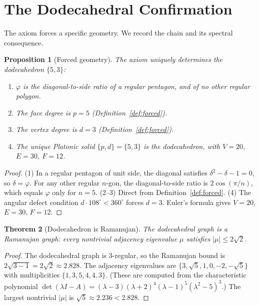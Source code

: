\documentclass[12pt, a4paper]{article}
\theoremstyle{plain}
\newtheorem{theorem}{Theorem}[section]
\newtheorem{proposition}[theorem]{Proposition}
\theoremstyle{definition}
\theoremstyle{remark}
\newcommand{\vp}{\varphi}
\begin{document}
\section{The Dodecahedral Confirmation}\label{sec:dodec}

The axiom forces a specific geometry.  We record the chain and
its spectral consequence.

\begin{proposition}[Forced geometry]\label{prop:dodec}
  The axiom uniquely determines the dodecahedron $\{5, 3\}$:
  \begin{enumerate}[nosep]
    \item $\vp$ is the diagonal-to-side ratio of a regular
          pentagon, and of no other regular polygon.
    \item The face degree is $p = 5$
          (Definition~\ref{def:forced}).
    \item The vertex degree is $d = 3$
          (Definition~\ref{def:forced}).
    \item The unique Platonic solid $\{p, d\} = \{5, 3\}$ is the
          dodecahedron, with $V = 20$, $E = 30$, $F = 12$.
  \end{enumerate}
\end{proposition}

\begin{proof}
  (1) In a regular pentagon of unit side, the diagonal satisfies
  $\delta^2 - \delta - 1 = 0$, so $\delta = \vp$.
  For any other regular $n$-gon, the diagonal-to-side ratio is
  $2\cos(\pi/n)$, which equals $\vp$ only for $n = 5$.
  (2--3) Direct from Definition~\ref{def:forced}.
  (4) The angular defect condition $d \cdot 108^\circ < 360^\circ$
  forces $d = 3$.  Euler's formula gives $V = 20$, $E = 30$, $F = 12$.
\end{proof}

\begin{theorem}[Dodecahedron is Ramanujan]\label{thm:ramanujan}
  The dodecahedral graph is a Ramanujan graph: every nontrivial
  adjacency eigenvalue $\mu$ satisfies $|\mu| \leq 2\sqrt{2}$.
\end{theorem}

\begin{proof}
  The dodecahedral graph is $3$-regular, so the Ramanujan bound is
  $2\sqrt{3-1} = 2\sqrt{2} \approx 2.828$.  The adjacency
  eigenvalues are $\{3, \sqrt{5}, 1, 0, -2, -\sqrt{5}\}$ with
  multiplicities $\{1, 3, 5, 4, 4, 3\}$.
  (These are computed from the characteristic polynomial
  $\det(\lambda I - A) = (\lambda - 3)(\lambda + 2)^4(\lambda - 1)^5
  (\lambda^2 - 5)^3$.)
  The largest nontrivial $|\mu|$ is $\sqrt{5} \approx 2.236 < 2.828$.
\end{proof}
\end{document}
